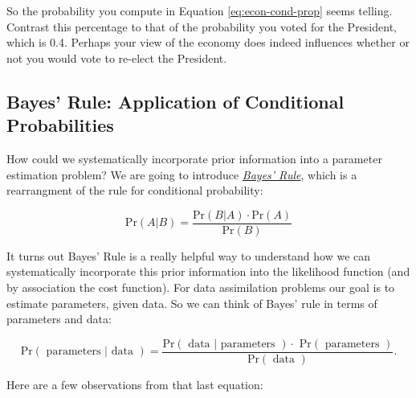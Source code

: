 \documentclass[
]{book}
\theoremstyle{definition}
\theoremstyle{definition}
\theoremstyle{definition}
\theoremstyle{remark}
\begin{document}
So the probability you compute in Equation \eqref{eq:econ-cond-prop} seems telling. Contrast this percentage to that of the probability you voted for the President, which is 0.4. Perhaps your view of the economy does indeed influences whether or not you would vote to re-elect the President.

\hypertarget{bayes-rule-application-of-conditional-probabilities}{%
\subsection{Bayes' Rule: Application of Conditional Probabilities}\label{bayes-rule-application-of-conditional-probabilities}}

How could we systematically incorporate prior information into a parameter estimation problem? We are going to introduce \href{https://en.wikipedia.org/wiki/Bayes\%27_theorem}{\emph{Bayes' Rule}}, which is a rearrangment of the rule for conditional probability:

\begin{equation}
\mbox{Pr} (A | B) = \frac{ \mbox{Pr} (B | A) \cdot  \mbox{Pr}(A)}{\mbox{Pr}(B) }
\end{equation}

It turns out Bayes' Rule is a really helpful way to understand how we can systematically incorporate this prior information into the likelihood function (and by association the cost function). For data assimilation problems our goal is to estimate parameters, given data. So we can think of Bayes' rule in terms of parameters and data:

\begin{equation}
\mbox{Pr}( \mbox{ parameters } | \mbox{ data }) = \frac{\mbox{Pr}( \mbox{ data } | \mbox{ parameters }) \cdot \mbox{ Pr}( \mbox{ parameters }) }{\mbox{Pr}(\mbox{ data }) }.
\end{equation}

Here are a few observations from that last equation:
\end{document}
